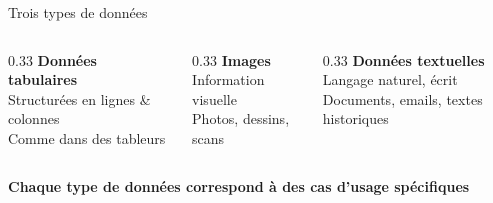 \begin{frame}{Trois types de données}

\begin{columns}[T]
\begin{column}{0.33\textwidth}
    \centering
    \textbf{Données tabulaires}\\
    \vspace{0.3cm}
    Structurées en lignes \& colonnes\\
    \vspace{0.2cm}
    \small Comme dans des tableurs
\end{column}

\begin{column}{0.33\textwidth}
    \centering
    \textbf{Images}\\
    \vspace{0.3cm}
    Information visuelle\\
    \vspace{0.2cm}
    \small Photos, dessins, scans
\end{column}

\begin{column}{0.33\textwidth}
    \centering
    \textbf{Données textuelles}\\
    \vspace{0.3cm}
    Langage naturel, écrit\\
    \vspace{0.2cm}
    \small Documents, emails, textes historiques
\end{column}
\end{columns}

\vspace{1cm}

\textbf{Chaque type de données correspond à des cas d'usage spécifiques}

\end{frame}



